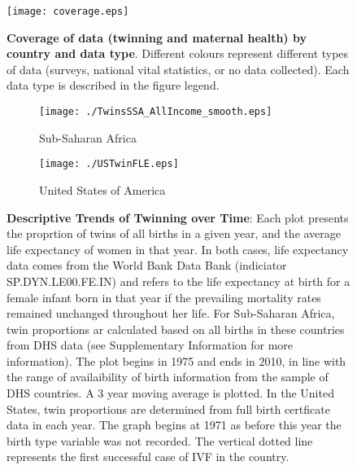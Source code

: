 \documentclass{nature}
\begin{document}
\begin{linenumbers}
\begin{spacing}{1}
\begin{figure}[htpb!]
\texttt{[image: coverage.eps]}
\caption{\textbf{Coverage of data (twinning and maternal health) by country and data type}. {\footnotesize  Different colours represent different types of data (surveys, national vital statistics, or no data collected).  Each data type is described in the figure legend.}}
\label{fig:twincoverage}
\end{figure}


\begin{figure}[htpb!]
\begin{subfigure}{.5\textwidth}
  \texttt{[image: ./TwinsSSA\_AllIncome\_smooth.eps]}
   \caption{Sub-Saharan Africa}
\end{subfigure}%
\begin{subfigure}{.5\textwidth}
  \texttt{[image: ./USTwinFLE.eps]}
  \caption{United States of America}
\end{subfigure}
\caption{\textbf{Descriptive Trends of Twinning over Time}: Each plot presents the proprtion of
twins of all births in a given year, and the average life expectancy of women in that year. In
both cases, life expectancy data comes from the World Bank Data Bank (indiciator SP.DYN.LE00.FE.IN) and refers to the life expectancy at birth for a female infant born in that year if the prevailing mortality rates remained unchanged throughout her life.  For Sub-Saharan Africa, twin proportions ar calculated based on all births in these countries from DHS data (see Supplementary Information for more information).  The plot begins in 1975 and ends in 2010, in line with the range of availaibility of birth information from the sample of DHS countries.  A 3 year moving average is plotted.  In the United States, twin proportions are determined from full birth certficate data in each year.  The graph begins at 1971 as before this year the birth type variable was not recorded.  The vertical dotted line represents the first successful case of IVF in the country.}
\end{figure}

\clearpage
\thispagestyle{empty}









\end{spacing}
\end{linenumbers}
\end{document}
